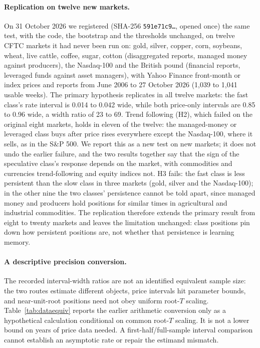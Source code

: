 \paragraph{Replication on twelve new markets.} On 31 October 2026 we registered (SHA-256 \texttt{591e71c9\ldots}, opened once) the same test, with the code, the bootstrap and the thresholds unchanged, on twelve CFTC markets it had never been run on: gold, silver, copper, corn, soybeans, wheat, live cattle, coffee, sugar, cotton (disaggregated reports, managed money against producers), the Nasdaq-100 and the British pound (financial reports, leveraged funds against asset managers), with Yahoo Finance front-month or index prices and reports from June 2006 to 27 October 2026 (1,039 to 1,041 usable weeks). The primary hypothesis replicates in all twelve markets: the fast class's rate interval is 0.014 to 0.042 wide, while both price-only intervals are 0.85 to 0.96 wide, a width ratio of 23 to 69. Trend following (H2), which failed on the original eight markets, holds in eleven of the twelve: the managed-money or leveraged class buys after price rises everywhere except the Nasdaq-100, where it sells, as in the S\&P 500. We report this as a new test on new markets; it does not undo the earlier failure, and the two results together say that the sign of the speculative class's response depends on the market, with commodities and currencies trend-following and equity indices not. H3 fails: the fast class is less persistent than the slow class in three markets (gold, silver and the Nasdaq-100); in the other nine the two classes' persistence cannot be told apart, since managed money and producers hold positions for similar times in agricultural and industrial commodities. The replication therefore extends the primary result from eight to twenty markets and leaves the limitation unchanged: class positions pin down how persistent positions are, not whether that persistence is learning memory.

\paragraph{A descriptive precision conversion.} The recorded interval-width ratios are not an identified equivalent sample size: the two routes estimate different objects, price intervals hit parameter bounds, and near-unit-root positions need not obey uniform root-$T$ scaling. Table~\ref{tab:dataequiv} reports the earlier arithmetic conversion only as a hypothetical calculation conditional on common root-$T$ scaling. It is not a lower bound on years of price data needed. A first-half/full-sample interval comparison cannot establish an asymptotic rate or repair the estimand mismatch.

